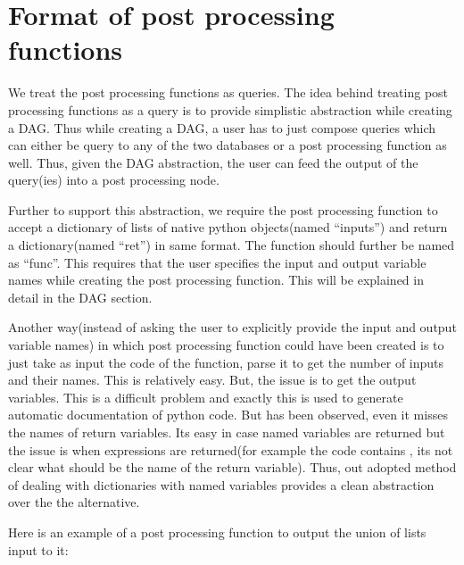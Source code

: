 \documentclass[letterpaper,10pt,english]{sphinxmanual}
\begin{document}
\section{Format of post processing functions}
\label{\detokenize{postprocessing:format-of-post-processing-functions}}
We treat the post processing functions as queries. The idea behind treating post processing functions as a query is to provide simplistic abstraction while creating a DAG. Thus while creating a DAG, a user has to just compose queries which can either be query to any of the two databases or a post processing function as well. Thus, given the DAG abstraction, the user can feed the output of the query(ies) into a post processing node.

Further to support this abstraction, we require the post processing function to accept a dictionary of lists of native python objects(named “inputs”) and return a dictionary(named “ret”) in same format. The function should further be named as “func”. This requires that the user specifies the input and output variable names while creating the post processing function. This will be explained in detail in the DAG section.

Another way(instead of asking the user to explicitly provide the input and output variable names) in which post processing function could have been created is to just take as input the code of the function, parse it to get the number of inputs and their names. This is relatively easy. But, the issue is to get the output variables. This is a difficult problem and exactly this is used to generate automatic documentation of python code. But has been observed, even it misses the names of return variables. Its easy in case named variables are returned but the issue is when expressions are returned(for example the code contains , its not clear what should be the name of the return variable). Thus, out adopted method of dealing with dictionaries with named variables provides a clean abstraction over the the alternative.

Here is an example of a post processing function to output the union of lists input to it:
\end{document}
